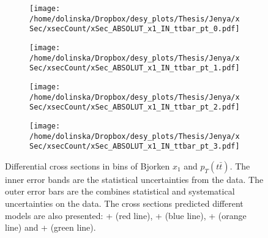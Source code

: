 \begin{figure}[p]
\centering
\begin{subfigure}
  \centering
  \texttt{[image: /home/dolinska/Dropbox/desy\_plots/Thesis/Jenya/xSec/xsecCount/xSec\_ABSOLUT\_x1\_IN\_ttbar\_pt\_0.pdf]}
\end{subfigure}
\begin{subfigure}
  \centering
  \texttt{[image: /home/dolinska/Dropbox/desy\_plots/Thesis/Jenya/xSec/xsecCount/xSec\_ABSOLUT\_x1\_IN\_ttbar\_pt\_1.pdf]}
\end{subfigure}
\begin{subfigure}
  \centering
  \texttt{[image: /home/dolinska/Dropbox/desy\_plots/Thesis/Jenya/xSec/xsecCount/xSec\_ABSOLUT\_x1\_IN\_ttbar\_pt\_2.pdf]}
\end{subfigure}
\begin{subfigure}
  \centering
  \texttt{[image: /home/dolinska/Dropbox/desy\_plots/Thesis/Jenya/xSec/xsecCount/xSec\_ABSOLUT\_x1\_IN\_ttbar\_pt\_3.pdf]}
\end{subfigure}
\caption{Differential cross sections in bins of Bjorken $x_{1}$ and $p_{T}(t\bar{t})$. The inner error bands are the statistical uncertainties from the data.
         The outer error bars are the combines statistical and systematical uncertainties on the data. The cross sections predicted different models are also presented:
         \MG + \PYTHIA (red line), \Powheg + \PYTHIA (blue line), \Powheg + \HERWIG (orange line) and \MCNLO + \HERWIG (green line).}
\label{fig:XSU_2D_x1_pttt1}
\end{figure}